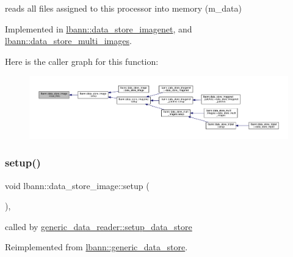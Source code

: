 reads all files assigned to this processor into memory (m\+\_\+data) 



Implemented in \hyperlink{classlbann_1_1data__store__imagenet_a70cfd8f529aad8d66993000da7350ec5}{lbann\+::data\+\_\+store\+\_\+imagenet}, and \hyperlink{classlbann_1_1data__store__multi__images_a8ce8ccf3c7b0d19adfb838108bec075b}{lbann\+::data\+\_\+store\+\_\+multi\+\_\+images}.

Here is the caller graph for this function\+:\nopagebreak
\begin{figure}[H]
\begin{center}
\leavevmode
\includegraphics[width=350pt]{classlbann_1_1data__store__image_a146874a68c24213f5509efb9727cb6e5_icgraph}
\end{center}
\end{figure}
\mbox{\label{classlbann_1_1data__store__image_a79280b3aa9a207dfacad2bcc9824ec73}} 
\subsubsection{\texorpdfstring{setup()}{setup()}}
{\footnotesize\ttfamily void lbann\+::data\+\_\+store\+\_\+image\+::setup (\begin{DoxyParamCaption}{ }\end{DoxyParamCaption})\hspace{0.3cm}{\ttfamily [override]}, {\ttfamily [virtual]}}



called by \hyperlink{classlbann_1_1generic__data__reader_a8b2a09d38512fc11f1b9d572c89100a7}{generic\+\_\+data\+\_\+reader\+::setup\+\_\+data\+\_\+store} 



Reimplemented from \hyperlink{classlbann_1_1generic__data__store_a1cff17def02ee21b6ca0befeb04bb582}{lbann\+::generic\+\_\+data\+\_\+store}.



